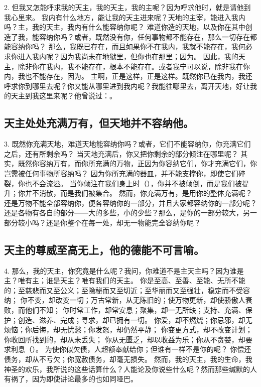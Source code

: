 2. 但我又怎能呼求我的天主，我的天主，我的主呢？因为呼求他时，就是请他到我心里来。 我内有什么地方，能让我的天主进来呢？天地的主宰，能进入我内吗？主，我的天主，我内有什么能容纳你呢？ 难道你造的天地，以及你在其中创造了我，能容纳你吗？或者，既然没有你，任何事物都不能存在，那么一切存在都能容纳你吗？ 那么，我既已存在，而且如果你不在我内，我就不能存在，我何必求你进入我内呢？因为我尚未在地狱里，但你也在那里；因为。 因此，我的天主，除非你在我内，我不能存在，根本不能存在。或者我宁可以说，除非我在你内，我也不能存在，因为。 主啊，正是这样，正是这样。既然你已在我内，我还呼求你到哪里去呢？你又能从哪里进到我内呢？我能往哪里去，离开天地，好让我的天主到我这里来呢？他曾说过：。\par


\subsection{天主处处充满万有，但天地并不容纳他。}

3. 既然你充满天地，难道天地能容纳你吗？或者，它们不能容纳你，你充满它们之后，还有所剩余吗？ 当天地充满后，你又把你剩余的部分倾注在哪里呢？ 其实，既然你容纳万有，而你所充满的万物，正因为你容纳它们，你才充满它们，你岂需被任何事物所容纳吗？ 因为你所充满的器皿，并不能支撑你，即使它们碎裂，你也不会流溢。 当你倾注在我们身上时（），你并不被倾倒，而是我们被提升；你并不消散，而是我们被集合。 然而，你充满万有，是用你的整体充满呢？还是万物不能全部容纳你，便各容纳你的一部分，并且大家都容纳你的一部分呢？还是各物有各自的部分——大的多些，小的少些？那么，是你的一部分较大，另一部分较小吗？还是你整个在每一处，却无一物能完全容纳你呢？\par


\subsection{天主的尊威至高无上，他的德能不可言喻。}

4. 那么，我的天主，你究竟是什么呢？我问，你难道不是主天主吗？因为谁是主？唯有主；谁是天主？唯有我们的天主。 你是至高、至善、至能、无所不能的；至慈悲而又至公义；至隐秘而又至切近；至华丽而又至强壮，稳定而不受容纳； 你不变，却改变一切；万古常新，从无陈旧的；使万物更新，却使骄傲人衰败，而他们不知； 你时常工作，却常安息；聚集，却一无所缺；支持、充满、保护；创造、滋养、完成；寻求，却已拥有一切。 你爱，却不燃烧；你忌邪，却无烦恼；你后悔，却无忧愁；你发怒，却仍然平静； 你变更方式，却不改变计划；你收回所找到的，却从未丢失； 你从无匮乏，却以收益为乐；你从不贪婪，却要求利息（）。 为使你似欠债，人超额奉献给你；但谁有一样不是你的呢？ 你偿还债务，却从不亏欠；你宽赦债务，却毫无损失。 然而，我的天主，我的生命，我神圣的欢乐，我所说的这些话算什么？人能论及你说些什么呢？然而那些缄默的人有祸了，因为即使讲论最多的也如同哑巴。\par


